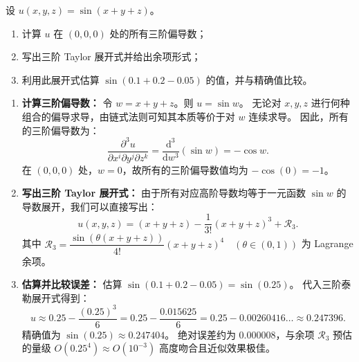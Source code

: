 \documentclass[lang=cn,11pt]{elegantbook}
\begin{document}
\begin{exercise}[提高：三元函数的高阶展开]
设 $u(x,y,z)=\sin(x+y+z)$。
\begin{enumerate}
  \item[(1)] 计算 $u$ 在 $(0,0,0)$ 处的所有三阶偏导数；
  \item[(2)] 写出三阶 Taylor 展开式并给出余项形式；
  \item[(3)] 利用此展开式估算 $\sin(0.1+0.2-0.05)$ 的值，并与精确值比较。
\end{enumerate}
\end{exercise}
\begin{solution}
\begin{enumerate}
  \item[(1)] \textbf{计算三阶偏导数：}
  令 $w = x+y+z$。则 $u = \sin w$。
  无论对 $x,y,z$ 进行何种组合的偏导求导，由链式法则可知其本质等价于对 $w$ 连续求导。
  因此，所有的三阶偏导数为：
  \[
  \frac{\partial^3 u}{\partial x^i \partial y^j \partial z^k} = \frac{\mathrm{d}^3}{\mathrm{d}w^3}(\sin w) = -\cos w.
  \]
  在 $(0,0,0)$ 处，$w=0$，故所有的三阶偏导数值均为 $-\cos(0) = -1$。

  \item[(2)] \textbf{写出三阶 Taylor 展开式：}
  由于所有对应高阶导数均等于一元函数 $\sin w$ 的导数展开，我们可以直接写出：
  \[
  u(x,y,z) = (x+y+z) - \frac{1}{3!}(x+y+z)^3 + \mathcal{R}_3.
  \]
  其中 $\mathcal{R}_3 = \dfrac{\sin(\theta(x+y+z))}{4!} (x+y+z)^4 \quad (\theta \in (0,1))$ 为 Lagrange 余项。

  \item[(3)] \textbf{估算并比较误差：}
  估算 $\sin(0.1+0.2-0.05) = \sin(0.25)$。
  代入三阶泰勒展开式得到：
  \[
  u \approx 0.25 - \frac{(0.25)^3}{6} = 0.25 - \frac{0.015625}{6} = 0.25 - 0.00260416\dots \approx 0.247396.
  \]
  精确值为 $\sin(0.25) \approx 0.247404$。
  绝对误差约为 $0.000008$，与余项 $\mathcal{R}_3$ 预估的量级 $O(0.25^4) \approx O(10^{-3})$ 高度吻合且近似效果极佳。
\end{enumerate}
\end{solution}
\end{document}
